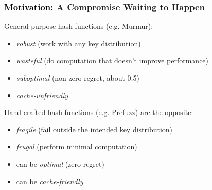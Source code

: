 \documentclass[onlytextwidth,usepdftitle=false]{beamer}
\newcommand\Motivation{Motiv\hspace{-0.06em}a\hspace{-0.03em}tion}
\begin{document}
\begin{frame}
\begin{columns}
\begin{column}{.60\linewidth}
\begin{figure}[H]
\end{figure}
\begin{figure}[H]
\end{figure}
\end{column}
\end{columns}
\end{frame}

\begin{frame}
\frametitle{\textcolor{black}{\Motivation:} A Compromise W\hspace{-0.09em}aiting to Happen}
General-purpose hash functions (e.g. Murmur):
\begin{itemize}
\item \emph{robust} (work with any key distribution)
\item \emph{wasteful} (do computation that doesn't improve performance)
\item \emph{suboptimal} (non-zero regret, about 0.5)
\item \emph{cache-unfriendly}
\end{itemize}

Hand-crafted hash functions (e.g. Prefuzz) are the opposite:
\begin{itemize}
\item \emph{fragile} (fail outside the intended key distribution)
\item \emph{frugal} (perform minimal computation)
\item can be \emph{optimal} (zero regret)
\item can be \emph{cache-friendly}
\end{itemize}
\end{frame}

\end{document}

